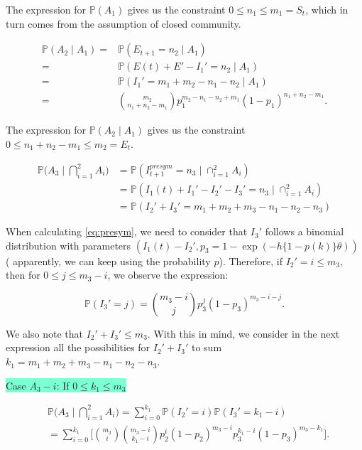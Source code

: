 \documentclass[a4paper]{article}
\theoremstyle{remark}
\begin{document}
The expression for $\mathbb{P}(A_{1})$ gives us the constraint $0\leq n_1\leq m_1=S_{t}$, which in turn comes from the assumption of closed community.


\begin{align*}
   \mathbb{P}(A_{2}\mid A_{1})=&\mathbb{P}(E_{t+1}=n_2 \mid A_{1}) \\
   =& \mathbb{P}(E(t)+E'-I_{1}'=n_2 \mid A_{1})\\
   =& \mathbb{P}(I_{1}'=m_1+m_2-n_1-n_2 \mid A_{1}) \\
   =& {m_2 \choose n_1+n_2-m_1}p_1^{m_2-n_1-n_2+m_1}(1-p_1)^{n_1+n_2-m_1}.
\end{align*}

The expression for $\mathbb{P}(A_{2}\mid A_{1})$ gives us the constraint $0\leq n_1+n_2-m_1\leq m_2=E_{t}$.

\begin{align}
   \mathbb{P}\bigg(A_{3}\mid \bigcap_{i=1}^{2}A_{i}\bigg)&= \mathbb{P}(I_{t+1}^{presym}=n_3 \mid \cap_{i=1}^{2}A_{i}) \\
   &= \mathbb{P}(I_1(t)+I_{1}'-I_{2}'-I_{3}'=n_3 \mid \cap_{i=1}^{2}A_{i})\\
   &= \mathbb{P}(I_{2}'+I_{3}'=m_1+m_2+m_3-n_1-n_2-n_3)
   \label{eq:presym}
\end{align}

When calculating \eqref{eq:presym}, we need to consider that $I_{3}'$ follows a binomial distribution with parameters $(I_1(t)-I_{2}', p_3=1-\exp(-h\{1-p(k)\}\theta))$ ({\color{red} apparently, we can keep using the probability $p$}). Therefore, if $I_{2}'=i\leq m_3$, then for $0\leq j \leq m_3 -i$, we observe the expression:

\[\mathbb{P}(I_{3}'=j) ={m_3-i \choose j}p_3^{j}(1-p_3)^{m_3-i-j}.\]


We also note that $I_{2}'+I_{3}'\leq m_3$. With this in mind, we consider in the next expression all the possibilities for $I_{2}'+I_{3}'$ to sum $k_1=m_1+m_2+m_3-n_1-n_2-n_3$.

\medskip

\colorbox{Aquamarine}{Case $A_3-i$: If $0\leq k_1\leq m_3$}


\begin{equation*}
\begin{split}
&\mathbb{P}\bigg( A_{3}\mid \bigcap_{i=1}^{2}A_{i}\bigg) = \sum_{i=0}^{k_1} \mathbb{P}(I_{2}'=i)\mathbb{P}(I_{3}'=k_1-i)\\
&= \sum_{i=0}^{k_1}\Bigg[{m_3 \choose i}{m_3-i \choose k_1-i}p_2^{i}(1-p_2)^{m_3-i}p_3^{k_1-i}(1-p_3)^{m_3-k_1}\Bigg].
\end{split}
\end{equation*}
\end{document}
